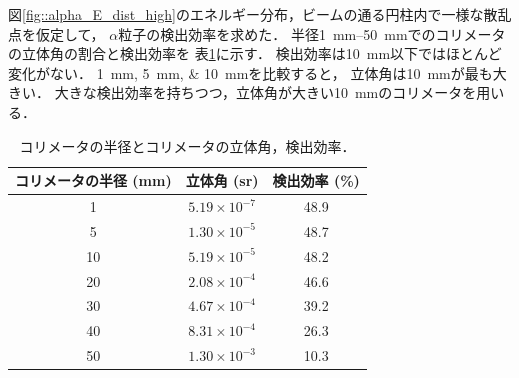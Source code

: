 \documentclass[../master]{subfiles}
\begin{document}
図\ref{fig::alpha_E_dist_high}のエネルギー分布，ビームの通る円柱内で一様な散乱点を仮定して，
$\alpha$粒子の検出効率を求めた．
半径\SIrange{1}{50}{\milli\metre}でのコリメータの立体角の割合と検出効率を
表\ref{tab::solid_angle_percent}に示す．
検出効率は\SI{10}{\milli\metre}以下ではほとんど変化がない．
\SIlist{1;5;10}{\milli\metre}を比較すると，
立体角は\SI{10}{\milli\metre}が最も大きい．
大きな検出効率を持ちつつ，立体角が大きい\SI{10}{\milli\metre}のコリメータを用いる．
\begin{table}
  \centering
  \caption{コリメータの半径とコリメータの立体角，検出効率．}
  \label{tab::solid_angle_percent}
  \begin{tabular}{ccc}
    \toprule
    コリメータの半径 (\si{\milli\metre}) & 立体角 (\si{\steradian}) & 検出効率 (\si{\percent})\\%
    \midrule
     1 & $5.19\times10^{-7}$ & 48.9 \\
     5 & $1.30\times10^{-5}$ & 48.7 \\%
    10 & $5.19\times10^{-5}$ & 48.2 \\%
    20 & $2.08\times10^{-4}$ & 46.6 \\%
    30 & $4.67\times10^{-4}$ & 39.2 \\%
    40 & $8.31\times10^{-4}$ & 26.3 \\%
    50 & $1.30\times10^{-3}$ & 10.3 \\%
    \bottomrule
  \end{tabular}
\end{table}
\end{document}
